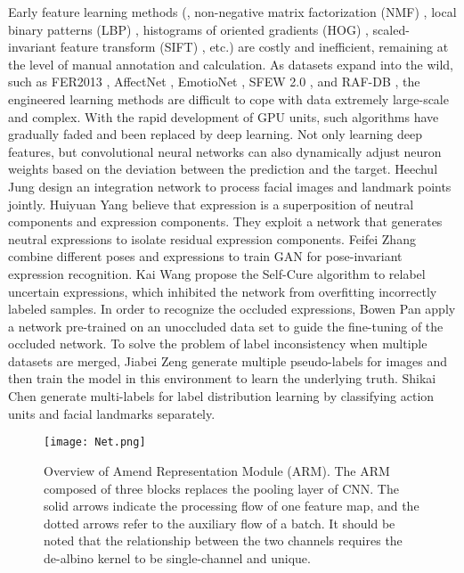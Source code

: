 \documentclass[10pt,twocolumn,letterpaper]{article}
\begin{document}
	Early feature learning methods (\eg, non-negative matrix factorization (NMF) \cite{nmf}, local binary patterns (LBP) \cite{lbp}, histograms of oriented gradients (HOG) \cite{hog}, scaled-invariant feature transform (SIFT) \cite{sift}, etc.) are costly and inefficient, remaining at the level of manual annotation and calculation. As datasets expand into the wild, such as FER2013 \cite{fer2013}, AffectNet \cite{affectnet}, EmotioNet \cite{emotionet}, SFEW 2.0 \cite{sfew2.0}, and RAF-DB \cite{raf-db}, the engineered learning methods are difficult to cope with data extremely large-scale and complex. With the rapid development of GPU units, such algorithms have gradually faded and been replaced by deep learning. Not only learning deep features, but convolutional neural networks can also dynamically adjust neuron weights based on the deviation between the prediction and the target. Heechul Jung \etal \cite{jung} design an integration network to process facial images and landmark points jointly. Huiyuan Yang \etal \cite{yang} believe that expression is a superposition of neutral components and expression components. They exploit a network that generates neutral expressions to isolate residual expression components. Feifei Zhang \etal \cite{zhangfeifei} combine different poses and expressions to train GAN for pose-invariant expression recognition. Kai Wang \etal \cite{scn} propose the Self-Cure algorithm to relabel uncertain expressions, which inhibited the network from overfitting incorrectly labeled samples. In order to recognize the occluded expressions, Bowen Pan \etal \cite{pan} apply a network pre-trained on an unoccluded data set to guide the fine-tuning of the occluded network. To solve the problem of label inconsistency when multiple datasets are merged, Jiabei Zeng \etal \cite{zeng} generate multiple pseudo-labels for images and then train the model in this environment to learn the underlying truth. Shikai Chen \etal \cite{chenshikai} generate multi-labels for label distribution learning by classifying action units and facial landmarks separately.



\begin{figure*}
\begin{center}
\texttt{[image: Net.png]}
\end{center}
   \caption{Overview of Amend Representation Module (ARM). The ARM composed of three blocks replaces the pooling layer of CNN. The solid arrows indicate the processing flow of one feature map, and the dotted arrows refer to the auxiliary flow of a batch. It should be noted that the relationship between the two channels requires the de-albino kernel to be single-channel and unique.}
\label{fig:Net}
\end{figure*}
\end{document}
